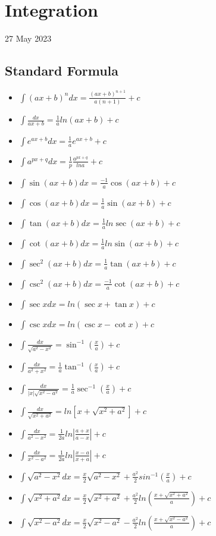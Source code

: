 \documentclass[12pt]{article}
\begin{document}
\section{Integration}
27 May 2023
\subsection{Standard Formula}
\begin{itemize}
\item $\int(ax+b)^n dx=\frac{(ax+b)^{n+1}}{a(n+1)}+c$
\item $\int \frac{dx}{ax+b}=\frac{1}{a} ln(ax+b)  +c$
\item $\int e^{ax+b}dx= \frac{1}{a} e^{ax+b}+c$
\item $\int a^{px+q}dx=\frac{1}{p}\frac{a^{px+q}}{lna} +c$
\item $\int \sin(ax+b)dx=\frac{-1}{a}\cos(ax+b)+c$
\item $\int \cos(ax+b)dx=\frac{1}{a}\sin(ax+b)+c$
\item $\int \tan(ax+b)dx=\frac{1}{a}ln \sec(ax+b)+c$
\item $\int \cot(ax+b)dx=\frac{1}{a}ln \sin(ax+b)+c$
\item $\int \sec^2(ax+b)dx=\frac{1}{a}\tan(ax+b)+c$
\item $\int \csc^2(ax+b)dx=\frac{-1}{a} \cot(ax+b)+c$
\item $\int \sec xdx=ln(\sec x+\tan x)+c$
\item $\int \csc xdx=ln(\csc x-\cot x)+c$
\item $\int \frac{dx}{\sqrt{a^2-x^2}}=\sin^{-1}(\frac{x}{a})+c$
\item $\int \frac{dx}{a^2+x^2}=\frac{1}{a}\tan^{-1}(\frac{x}{a})+c$
\item $\int \frac{dx}{|x|\sqrt{x^2-a^2}}=\frac{1}{a}\sec^{-1}(\frac{x}{a})+c$
\item $\int \frac{dx}{\sqrt{x^2+a^2}}=ln[{x+\sqrt{x^2+a^2}}]+c$
\item $\int \frac{dx}{a^2-x^2}=\frac{1}{2a}ln|\frac{a+x}{a-x}|+c$
\item $\int \frac{dx}{x^2-a^2}=\frac{1}{2a}ln|\frac{x-a}{x+a}|+c$
\item $\int \sqrt{a^2-x^2}dx=\frac{x}{2}\sqrt{a^2-x^2}+\frac{a^2}{2}sin^{-1}(\frac{x}{a})+c$
\item $\int \sqrt{x^2+a^2}dx=\frac{x}{2}\sqrt{x^2+a^2}+\frac{a^2}{2}ln(\frac{x+\sqrt{x^2+a^2}}{a})+c$
\item $\int \sqrt{x^2-a^2}dx=\frac{x}{2}\sqrt{x^2-a^2}-\frac{a^2}{2}ln(\frac{x+\sqrt{x^2-a^2}}{a})+c$
\end{itemize}
\end{document}
